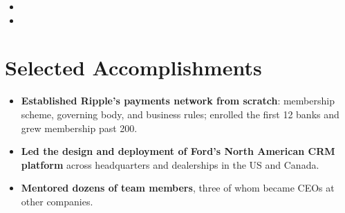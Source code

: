 \documentclass[11pt,letterpaper,sans]{moderncv}
\begin{document}
\begin{itemize}
\vspace{3pt}

\item{}

\vspace{3pt}

\item{}

\end{itemize}


\section{Selected Accomplishments}
\vspace{1pt}
\begin{itemize}
\item {\textbf{Established Ripple's payments network from scratch}: membership scheme, governing body, and business rules; enrolled the first 12 banks and grew membership past 200.}
\item {\textbf{Led the design and deployment of Ford's North American CRM platform} across headquarters and dealerships in the US and Canada.}
\item {\textbf{Mentored dozens of team members}, three of whom became CEOs at other companies.}
\end{itemize}

\end{document}
